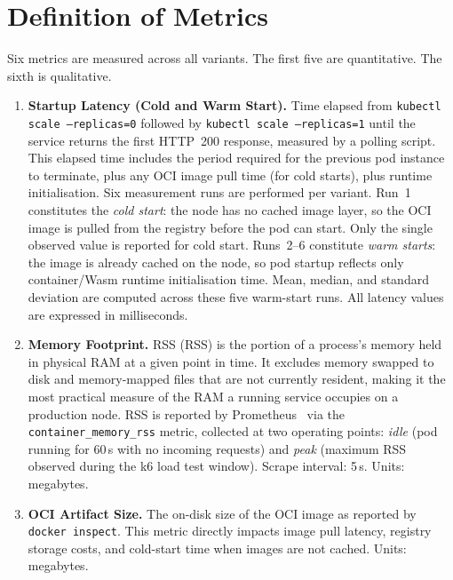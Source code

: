 \section{Definition of Metrics}
\label{sec:metrics}

Six metrics are measured across all variants. The first five are quantitative. The sixth is qualitative.

\begin{enumerate}
    \item \begin{sloppypar}\textbf{Startup Latency (Cold and Warm Start).} Time elapsed from \texttt{kubectl scale --replicas=0} followed by \texttt{kubectl scale --replicas=1} until the service returns the first \acs{HTTP}~200 response, measured by a polling script. This elapsed time includes the period required for the previous pod instance to terminate, plus any \acs{OCI} image pull time (for cold starts), plus runtime initialisation. Six measurement runs are performed per variant. Run~1 constitutes the \textit{cold start}: the node has no cached image layer, so the \acs{OCI} image is pulled from the registry before the pod can start. Only the single observed value is reported for cold start. Runs~2--6 constitute \textit{warm starts}: the image is already cached on the node, so pod startup reflects only container/\acs{Wasm} runtime initialisation time. Mean, median, and standard deviation are computed across these five warm-start runs. All latency values are expressed in milliseconds.\end{sloppypar}

    \item \begin{sloppypar}\textbf{Memory Footprint.} \acl{RSS} (\acs{RSS}) is the portion of a process's memory held in physical \acs{RAM} at a given point in time. It excludes memory swapped to disk and memory-mapped files that are not currently resident, making it the most practical measure of the \acs{RAM} a running service occupies on a production node. \acs{RSS} is reported by Prometheus~\cite{prometheus2024cncf} via the \texttt{container\_memory\_rss} metric, collected at two operating points: \textit{idle} (pod running for 60\,s with no incoming requests) and \textit{peak} (maximum \acs{RSS} observed during the k6 load test window). Scrape interval: 5\,s. Units: megabytes.\end{sloppypar}

    \item \begin{sloppypar}\textbf{OCI Artifact Size.} The on-disk size of the \acs{OCI} image as reported by \texttt{docker~inspect}. This metric directly impacts image pull latency, registry storage costs, and cold-start time when images are not cached. Units: megabytes.\end{sloppypar}


\end{enumerate}
